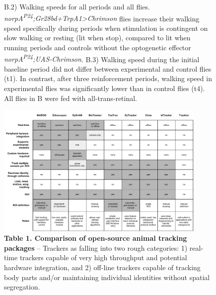 \documentclass[10pt]{article}
\begin{document}
\begin{figure}[t!]
{	B.2) Walking speeds for all periods and all flies. \textit{norpA\textsuperscript{P24};Gr28bd+TrpA1>Chrimson} flies increase their walking speed specifically during periods when stimulation is contingent on slow walking or resting (lit when stop), compared to lit when running periods and controls without the optogenetic effector \textit{norpA\textsuperscript{P24};UAS-Chrimson}.
	B.3) Walking speed during the initial baseline period did not differ between experimental and control flies (t1). In contrast, after three reinforcement periods, walking speed in experimental flies was significantly lower than in control flies (t4). 
	All flies in B were fed with all-trans-retinal.} 
\end{figure}

\newpage
\begin{figure}[t!]
	\begin{center}
		\vspace*{-8cm}
		\includegraphics[width=0.9\textwidth]{../figures/platform_comparison_draft.pdf}
	\end{center}
	\caption*{\footnotesize \textbf{Table 1. Comparison of open-source animal tracking packages} -- Trackers as falling into two rough categories: 1) real-time trackers capable of very high throughput and potential hardware integration, and 2) off-line trackers capable of tracking body parts and/or maintaining individual identities without spatial segregation.}
\end{figure}
\end{document}
